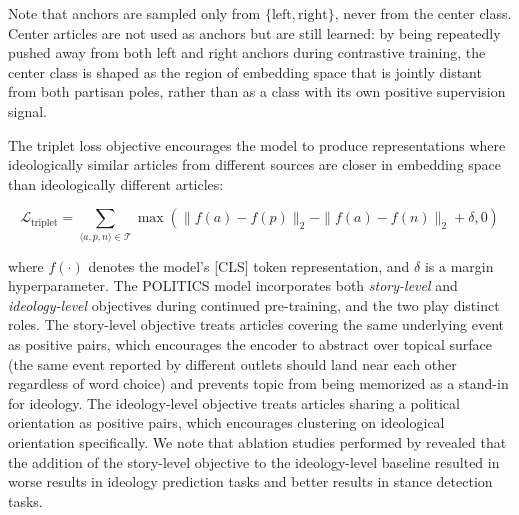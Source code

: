 Note that anchors are sampled only from $\{\text{left}, \text{right}\}$, never from the center class. Center articles are not used as anchors but are still learned: by being repeatedly pushed away from both left and right anchors during contrastive training, the center class is shaped as the region of embedding space that is jointly distant from both partisan poles, rather than as a class with its own positive supervision signal.

The triplet loss objective encourages the model to produce representations where ideologically similar articles from different sources are closer in embedding space than ideologically different articles:

\begin{equation}
    \mathcal{L}_{\text{triplet}} = \sum_{\langle a,p,n \rangle \in \mathcal{T}} \max\left( \|f(a) - f(p)\|_2 - \|f(a) - f(n)\|_2 + \delta, 0\right)
    \label{eqn:triplet_loss}
\end{equation}

where $f(\cdot)$ denotes the model's [CLS] token representation, and $\delta$ is a margin hyperparameter. The POLITICS model incorporates both \emph{story-level} and \emph{ideology-level} objectives during continued pre-training, and the two play distinct roles. The story-level objective treats articles covering the same underlying event as positive pairs, which encourages the encoder to abstract over topical surface (the same event reported by different outlets should land near each other regardless of word choice) and prevents topic from being memorized as a stand-in for ideology. The ideology-level objective treats articles sharing a political orientation as positive pairs, which encourages clustering on ideological orientation specifically. We note that ablation studies performed by \citet{liu2022politics} revealed that the addition of the story-level objective to the ideology-level baseline resulted in worse results in ideology prediction tasks and better results in stance detection tasks.
